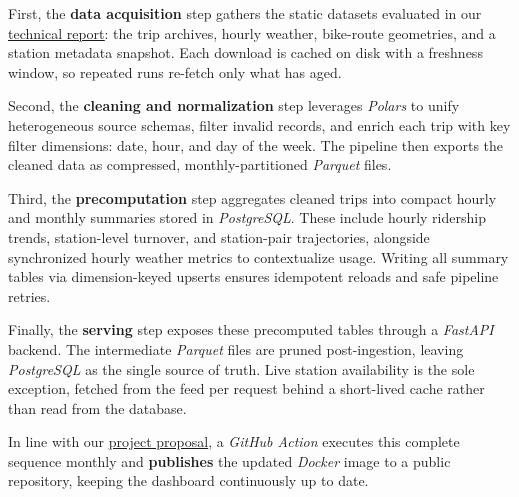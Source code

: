 First, the \textbf{data acquisition} step gathers the static datasets evaluated in our \href{https://github.com/davide-dona/nyc-bike-data-visualization/blob/main/docs/technical-report.pdf}{\underline{technical report}}: the trip archives, hourly weather, bike-route geometries, and a station metadata snapshot.
Each download is cached on disk with a freshness window, so repeated runs re-fetch only what has aged.

Second, the \textbf{cleaning and normalization} step leverages \emph{Polars} to unify heterogeneous source schemas, filter invalid records, and enrich each trip with key filter dimensions: date, hour, and day of the week.
The pipeline then exports the cleaned data as compressed, monthly-partitioned \emph{Parquet} files.

Third, the \textbf{precomputation} step aggregates cleaned trips into compact hourly and monthly summaries stored in \emph{PostgreSQL}.
These include hourly ridership trends, station-level turnover, and station-pair trajectories, alongside synchronized hourly weather metrics to contextualize usage.
Writing all summary tables via dimension-keyed upserts ensures idempotent reloads and safe pipeline retries.

Finally, the \textbf{serving} step exposes these precomputed tables through a \emph{FastAPI} backend.
The intermediate \emph{Parquet} files are pruned post-ingestion, leaving \emph{PostgreSQL} as the single source of truth.
Live station availability is the sole exception, fetched from the feed per request behind a short-lived cache rather than read from the database.

In line with our \href{https://github.com/davide-dona/nyc-bike-data-visualization/blob/main/docs/proposal.pdf}{\underline{project proposal}}, a \emph{GitHub Action} executes this complete sequence monthly and \textbf{publishes} the updated \emph{Docker} image to a public repository, keeping the dashboard continuously up to date.

